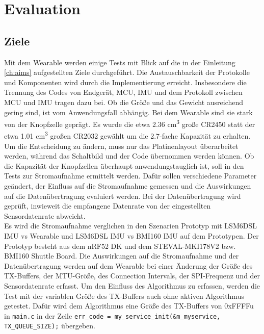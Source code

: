 \chapter{Evaluation}
\label{ch:evaluation}

\section{Ziele}
\label{ch:aimEval}
Mit dem Wearable werden einige Tests mit Blick auf die in der Einleitung \ref{ch:aims} aufgestellten Ziele durchgeführt.
Die Austauschbarkeit der Protokolle und Komponenten wird durch die Implementierung erreicht.
Insbesondere die Trennung des Codes von Endgerät, MCU, IMU und dem Protokoll zwischen MCU und IMU tragen dazu bei.
Ob die Größe und das Gewicht ausreichend gering sind, ist vom Anwendungsfall abhängig.
Bei dem Wearable sind sie stark von der Knopfzelle geprägt.
Es wurde die etwa 2.36 cm\textsuperscript{3} große CR2450 statt der etwa 1.01 cm\textsuperscript{3} großen CR2032 gewählt um die 2.7-fache Kapazität zu erhalten.
Um die Entscheidung zu ändern, muss nur das Platinenlayout überarbeitet werden, während das Schaltbild und der Code übernommen werden können.
Ob die Kapazität der Knopfzellen überhaupt anwendungstauglich ist, soll in den Tests zur Stromaufnahme ermittelt werden.
Dafür sollen verschiedene Parameter geändert, der Einfluss auf die Stromaufnahme gemessen und die Auswirkungen auf die Datenübertragung evaluiert werden.
Bei der Datenübertragung wird geprüft, inwieweit die empfangene Datenrate von der eingestellten Sensordatenrate abweicht.\\
Es wird die Stromaufnahme verglichen in den Szenarien Prototyp mit LSM6DSL IMU vs Wearable und LSM6DSL IMU vs BMI160 IMU auf dem Prototypen.
Der Prototyp besteht aus dem nRF52 DK und dem STEVAL-MKI178V2 bzw. BMI160 Shuttle Board.
Die Auswirkungen auf die Stromaufnahme und der Datenübertragung werden auf dem Wearable bei einer Änderung der Größe des TX-Buffers, der MTU-Größe, des Connection Intervals, der SPI-Frequenz und der Sensordatenrate erfasst.
Um den Einfluss des Algorithmus zu erfassen, werden die Test mit der variablen Größe des TX-Buffers auch ohne aktiven Algorithmus getestet.
Dafür wird dem Algorithmus eine Größe des TX-Buffers von 0xFFFFu in \texttt{main.c} in der Zeile \texttt{err\_code = my\_service\_init(\allowbreak{}\&m\_myservice, TX\_QUEUE\_SIZE);} übergeben.

